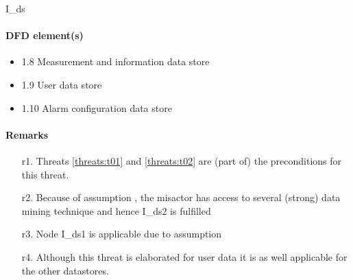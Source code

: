 I\_ds

\paragraph{DFD element(s)}

\begin{itemize}
  \item 1.8 Measurement and information data store
  \item 1.9 User data store
  \item 1.10 Alarm configuration data store
\end{itemize}

\paragraph{Remarks}
	\begin{enumerate}
         \item[r1.] Threats \ref{threats:t01} and \ref{threats:t02} are
		(part of) the preconditions for this threat.
         \item[r2.] Because of assumption %
		 , the misactor has access to several (strong) data mining technique and hence
		 I\_ds2 is fulfilled
         \item[r3.] Node I\_ds1 is applicable due to assumption %
         \item[r4.] Although this threat is elaborated for user data it is as
         well applicable for the other datastores.
    \end{enumerate}
